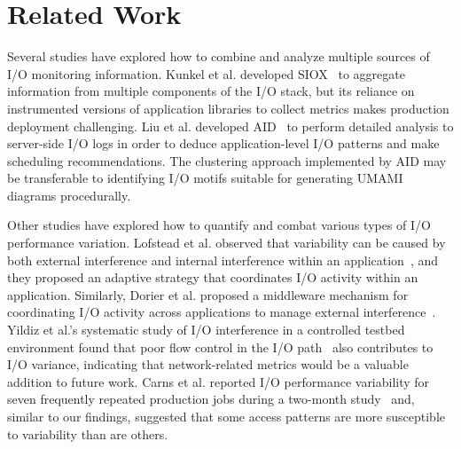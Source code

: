 \section{Related Work} \label{sec:related}

Several studies have explored how to combine and analyze multiple sources of I/O monitoring information.
Kunkel et al. developed SIOX~\cite{Kunkel:2014:SAC:2769884.2769901} to aggregate information from multiple components of the I/O stack, 
but its reliance on instrumented versions of application libraries to collect metrics makes production deployment challenging.
Liu et al. developed AID~\cite{Liu2016} to perform detailed analysis to server-side I/O logs in order to deduce application-level I/O patterns and make scheduling recommendations.  The clustering approach implemented by AID may be transferable to identifying I/O motifs suitable for generating UMAMI diagrams procedurally.

Other studies have explored how to quantify and combat various types of I/O performance variation.
Lofstead et al. observed that variability can be caused by both external interference and internal interference within an application~\cite{Lofstead2010}, and they proposed an adaptive strategy that coordinates I/O activity within an application.
Similarly, Dorier et al. proposed a middleware mechanism for coordinating I/O activity across applications to manage external interference~\cite{dorier2014calciom}.
Yildiz et al.'s systematic study of I/O interference in a controlled testbed environment found that poor flow control in the I/O path~\cite{Yildiz2016} also contributes to I/O variance, indicating that network-related metrics would be a valuable addition to future work.
Carns et al. reported I/O performance variability for seven frequently repeated production jobs during a two-month study~\cite{carns2011understanding} and, similar to our findings, suggested that some access patterns are more susceptible to variability than are others.
